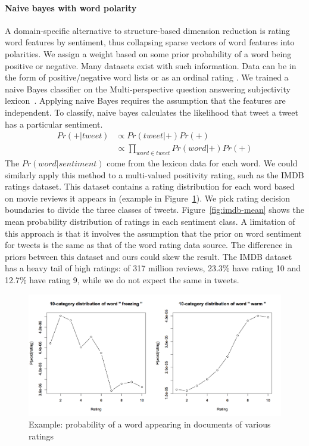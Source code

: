 \paragraph{Naive bayes with word polarity}

A domain-specific alternative to structure-based dimension reduction
is rating word features by sentiment, thus collapsing sparse vectors
of word features into polarities. We assign a weight
based on some prior probability of a word being positive or negative.
Many datasets exist with such information. Data can be in the form of
positive/negative word lists \cite{MPQA,BingLiu} or as an ordinal
rating \cite{MPQA}. We trained a naive Bayes classifier on the
Multi-perspective question answering subjectivity lexicon~\cite{MPQA}.
Applying naive Bayes requires the assumption that the features are
independent. To classify, naive bayes calculates the likelihood that
tweet a tweet has a particular sentiment.
\begin{align}
    Pr(+|tweet) &\propto Pr(tweet|+)Pr(+) \\
    &\propto \prod_{word \in tweet} Pr(word|+)Pr(+)
\end{align}
The $Pr(word|sentiment)$ come from the lexicon data for each word.
We could similarly apply this method to a multi-valued positivity
rating, such as the IMDB ratings dataset. This dataset contains a
rating distribution for each word based on movie reviews it appears in
(example in Figure~\ref{fig:imdb-word}). We pick rating decision
boundaries to divide the three classes of tweets.
Figure~\ref{fig:imdb-mean} shows the mean probability distribution of
ratings in each sentiment class.
A limitation of this approach is that it involves the assumption that
the prior on word sentiment for tweets is the same as that of the word rating
data source. The difference in priors between this dataset and ours
could skew the result. The IMDB dataset has a heavy tail of high
ratings: of 317 million reviews, 23.3\% have rating 10 and 12.7\% have
rating 9, while we do not expect the same in tweets.

\begin{figure}[htb]
\begin{center}
  \includegraphics[width=0.9\columnwidth]{figs/wordIMDB.png}
\begin{minipage}{0.9\columnwidth}
\end{minipage}
\end{center}
\caption{Example: probability of a word appearing in documents of
    various ratings}
\label{fig:imdb-word}
\end{figure}



